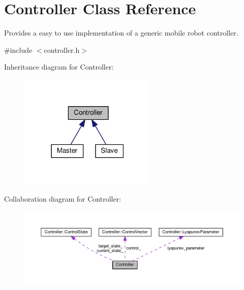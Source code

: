 \hypertarget{classController}{}\section{Controller Class Reference}
\label{classController}


Provides a easy to use implementation of a generic mobile robot controller.  




{\ttfamily \#include $<$controller.\+h$>$}



Inheritance diagram for Controller\+:
\nopagebreak
\begin{figure}[H]
\begin{center}
\leavevmode
\includegraphics[width=186pt]{classController__inherit__graph}
\end{center}
\end{figure}


Collaboration diagram for Controller\+:\nopagebreak
\begin{figure}[H]
\begin{center}
\leavevmode
\includegraphics[width=350pt]{classController__coll__graph}
\end{center}
\end{figure}
